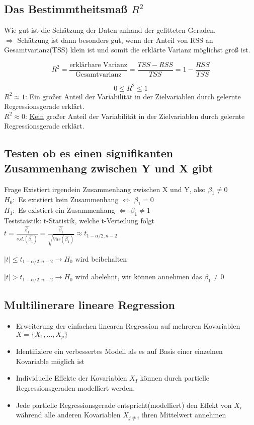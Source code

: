 \documentclass[../VorlesungMaster.tex]{subfiles}
\begin{document}
\subsection{Das Bestimmtheitsmaß $R^2$}
Wie gut ist die Schätzung der Daten anhand der gefitteten Geraden. \\
$\Rightarrow$ Schätzung ist dann besonders gut, wenn der Anteil von RSS an Gesamtvarianz(TSS) klein ist und somit die erklärte Varianz möglichst groß ist.

\[ R^2= \frac{\text{erklärbare Varianz}}{\text{Gesamtvarianz}}
= \frac{TSS-RSS}{TSS} = 1 - \frac{RSS}{TSS}\]

\[ 0 \leq R^2 \leq 1\]
$R^2 \approx 1$: Ein großer Anteil der Variabilität in der Zielvariablen durch gelernte Regressionsgerade erklärt. \\
$R^2 \approx 0$: \underline{Kein} großer Anteil der Variabilität in der Zielvariablen durch gelernte Regressionsgerade erklärt.





\subsection{Testen ob es einen signifikanten Zusammenhang zwischen Y und X gibt}
Frage Existiert irgendein Zusammenhang zwischen X und Y, also $\beta_1 \neq 0$\\
$H_0:$ Es existiert kein Zusammenhang $ \Leftrightarrow $ $ \beta_1 = 0$\\
$H_1:$ Es existiert ein Zusammenhang $ \Leftrightarrow $ $\beta_1 \neq 1$\\

Teststaistik: t-Statistik, welche t-Verteilung folgt $t= \frac{\hat{\beta_1}}{s.d.(\hat{\beta_1})} = \frac{\hat{\beta_1}}{\sqrt{Var(\hat{\beta_1})}} \approx t_{1-\alpha/2, n-2}$

$|t| \leq  t_{1-\alpha/2, n-2} \rightarrow H_0$ wird beibehalten

$|t| >  t_{1-\alpha/2, n-2} \rightarrow H_0$ wird abelehnt, wir können annehmen das $\beta_1 \neq 0$


\subsection{Multilinerare lineare Regression}
\begin{itemize}
	\item Erweiterung der einfachen linearen Regression auf mehreren Kovariablen $X=\{{X_1, \ldots, X_p}\}$
	\item Identifiziere ein verbessertes Modell als es auf Basis einer einzelnen Kovariable möglich ist 
	\item Individuelle Effekte der Kovariablen $X_I$ können durch partielle Regressionsgeraden modelliert werden.
	\item  Jede partielle Regressionsgerade entspricht(modelliert) den Effekt von $X_i$ während alle anderen Kovariablen $X_{j \neq i}$ ihren Mittelwert annehmen
\end{itemize}
\end{document}
